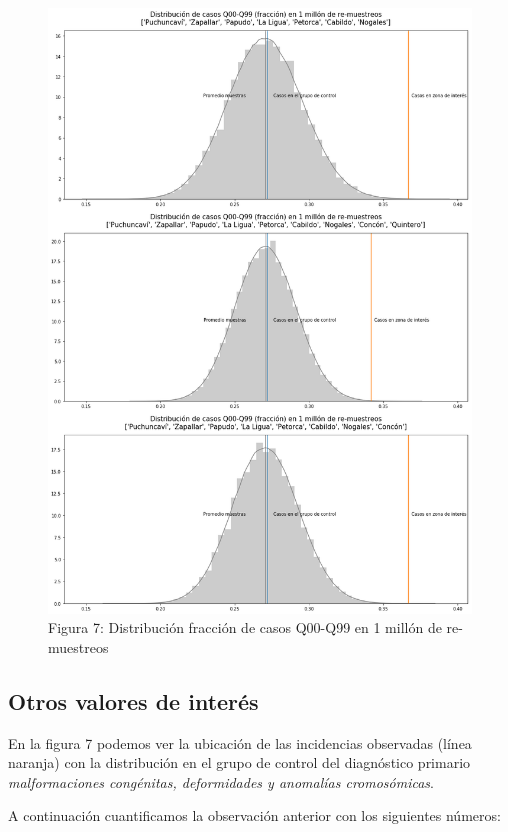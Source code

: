 \documentclass[]{article}
\begin{document}
\begin{figure}
\centering
\includegraphics{assets/distribucion.png}
\caption{Figura 7: Distribución fracción de casos Q00-Q99 en 1 millón de re-muestreos}
\end{figure}

\hypertarget{otros-valores-de-interuxe9s}{%
\subsection{Otros valores de
interés}\label{otros-valores-de-interuxe9s}}

En la figura 7 podemos ver la ubicación de las incidencias observadas
(línea naranja) con la distribución en el grupo de control del
diagnóstico primario \emph{malformaciones congénitas, deformidades y
anomalías cromosómicas}.

A continuación cuantificamos la observación anterior con los siguientes
números:
\end{document}
